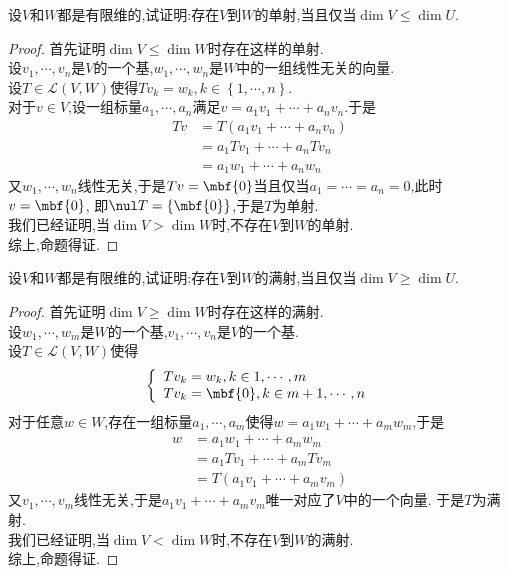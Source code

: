 \documentclass{ctexart}
\begin{document}
\begin{problem}[16.]
    设$V$和$W$都是有限维的,试证明:存在$V$到$W$的单射,当且仅当$\dim V\leqslant\dim U$.
\end{problem}
\begin{proof}
    首先证明$\dim V\leqslant\dim W$时存在这样的单射.\\
    设$v_1,\cdots,v_n$是$V$的一个基,$w_1,\cdots,w_n$是$W$中的一组线性无关的向量.\\
    设$T\in\mathcal{L}(V,W)$使得$Tv_k=w_k,k\in\left\{1,\cdots,n\right\}$.\\
    对于$v\in V$,设一组标量$a_1,\cdots,a_n$满足$v=a_1v_1+\cdots+a_nv_n$.于是
    $$\begin{aligned}
        Tv
        &= T\left(a_1v_1+\cdots+a_nv_n\right) \\
        &= a_1Tv_1+\cdots+a_nTv_n \\
        &= a_1w_1+\cdots+a_nw_n
    \end{aligned}$$
    又$w_1,\cdots,w_n$线性无关,于是$Tv=\mbf{0}$当且仅当$a_1=\cdots=a_n=0$,此时$v=\mbf{0}$,
    即$\nul T=\left\{\mbf{0}\right\}$,于是$T$为单射.\\
    我们已经证明,当$\dim V>\dim W$时,不存在$V$到$W$的单射.\\
    综上,命题得证.
\end{proof}
\begin{problem}[17.]
    设$V$和$W$都是有限维的,试证明:存在$V$到$W$的满射,当且仅当$\dim V\geqslant\dim U$.
\end{problem}
\begin{proof}
    首先证明$\dim V\geqslant\dim W$时存在这样的满射.\\
    设$w_1,\cdots,w_m$是$W$的一个基,$v_1,\cdots,v_n$是$V$的一个基.\\
    设$T\in\mathcal{L}(V,W)$使得
    $$\left\{\begin{array}{l}
        Tv_k=w_k,k\in{1,\cdots,m}\\
        Tv_k=\mbf{0},k\in{m+1,\cdots,n}
    \end{array}\right.$$
    对于任意$w\in W$,存在一组标量$a_1,\cdots,a_m$使得$w=a_1w_1+\cdots+a_mw_m$,于是
    $$\begin{aligned}
        w
        &= a_1w_1+\cdots+a_mw_m \\
        &= a_1Tv_1+\cdots+a_mTv_m \\
        &= T\left(a_1v_1+\cdots+a_mv_m\right)
    \end{aligned}$$
    又$v_1,\cdots,v_m$线性无关,于是$a_1v_1+\cdots+a_mv_m$唯一对应了$V$中的一个向量.
    于是$T$为满射.\\
    我们已经证明,当$\dim V<\dim W$时,不存在$V$到$W$的满射.\\
    综上,命题得证.
\end{proof}
\end{document}
